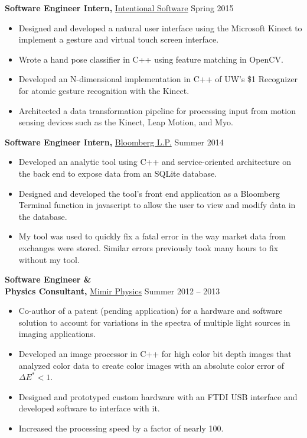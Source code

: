 \documentclass[margin]{res}
\begin{document}
\begin{minipage}{\textwidth}
\begin{resume}
{\bf Software Engineer Intern,} \uline{Intentional Software} \hfill Spring 2015
 \begin{itemize} \itemsep -2pt %
 \item Designed and developed a natural user interface using the Microsoft Kinect to implement a gesture and virtual touch screen interface.
 \item Wrote a hand pose classifier in C++ using feature matching in OpenCV.
 \item Developed an N-dimensional implementation in C++ of UW's \$1 Recognizer for atomic gesture recognition with the Kinect. %
 \item Architected a data transformation pipeline for processing input from motion sensing devices such as the Kinect, Leap Motion, and Myo.
 \end{itemize}



{\bf Software Engineer Intern,} \uline{Bloomberg L.P.} \hfill Summer 2014
 \begin{itemize} \itemsep -2pt
 \item Developed an analytic tool using C++ and service-oriented architecture on the back end to expose data from an SQLite database.
 \item Designed and developed the tool's front end application as a Bloomberg Terminal function in javascript to allow the user to view and modify data in the database.
 \item My tool was used to quickly fix a fatal error in the way market data from exchanges were stored. Similar errors previously took many hours to fix without my tool.
 \end{itemize}



{\bf Software Engineer \& \\ Physics Consultant,} \uline{Mimir Physics} \hfill Summer 2012 -- 2013
 \begin{itemize} \itemsep -2pt  %
 \item Co-author of a patent (pending application) for a hardware and software solution to account for variations in the spectra of multiple light sources in imaging applications.
 \item Developed an image processor in C++ for high color bit depth images that analyzed color data to create color images with an absolute color error of $\Delta E^* < 1$.
 \item Designed and prototyped custom hardware with an FTDI USB interface  and developed software to interface with it.
 \item Increased the processing speed by a factor of nearly 100.
 \end{itemize}


\end{resume}
\end{minipage}
\end{document}
